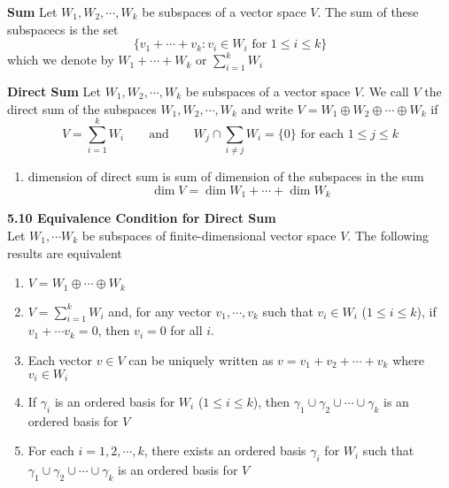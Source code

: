 \documentclass[11pt]{article}
\begin{document}

\begin{defn*}
    \textbf{Sum} Let $W_1, W_2,\cdots, W_k$ be subspaces of a vector space $V$. The sum of these subspacecs is the set 
    \[
        \{v_1 + \cdots + v_k : v_i \in W_i \text{ for } 1 \leq i \leq k\}    
    \]
    which we denote by $W_1 + \cdots + W_k$ or $\textstyle\sum_{i=1}^k W_i$
\end{defn*}

\begin{defn*}
    \textbf{Direct Sum} Let $W_1, W_2, \cdots, W_k$ be subspaces of a vector space $V$. We call $V$ the direct sum of the subspaces $W_1, W_2, \cdots, W_k$ and write $V = W_1 \oplus W_2 \oplus \cdots \oplus W_k$ if 
    \[
        V = \sum_{i=1}^k W_i    
        \qquad \text{and} \qquad 
        W_j \cap \sum_{i\neq j} W_i = \{ 0\} \text{ for each } 1 \leq j \leq k
    \]
    \begin{enumerate}
        \item dimension of direct sum is sum of dimension of the subspaces in the sum
        \[
            \dim{V} = \dim{W_1} + \cdots + \dim{W_k}
        \]
    \end{enumerate}
\end{defn*}


\begin{theorem*}
    \textbf{5.10 Equivalence Condition for Direct Sum} \\
    Let $W_1, \cdots W_k$ be subspaces of finite-dimensional vector space $V$. The following results are equivalent
    \begin{enumerate}
        \item $V = W_1 \oplus \cdots \oplus W_k$ 
        \item $V = \textstyle\sum_{i=1}^k W_i$ and, for any vector $v_1, \cdots, v_k$ such that $v_i \in W_i$ ($1\leq i \leq k$), if $v_1 + \cdots v_k = 0$, then $v_i = 0$ for all $i$.
        \item Each vector $v\in V$ can be uniquely written as $v = v_1 + v_2 + \cdots + v_k$ where $v_i \in W_i$ 
        \item If $\gamma_i$ is an ordered basis for $W_i$ ($1\leq i \leq k$), then $\gamma_1 \cup \gamma_2 \cup \cdots \cup \gamma_k$ is an ordered basis for $V$
        \item For each $i = 1,2,\cdots, k$, there exists an ordered basis $\gamma_i$ for $W_i$ such that $\gamma_1 \cup \gamma_2 \cup\cdots \cup \gamma_k$ is an ordered basis for $V$ 
    \end{enumerate}
\end{theorem*}
\end{document}
